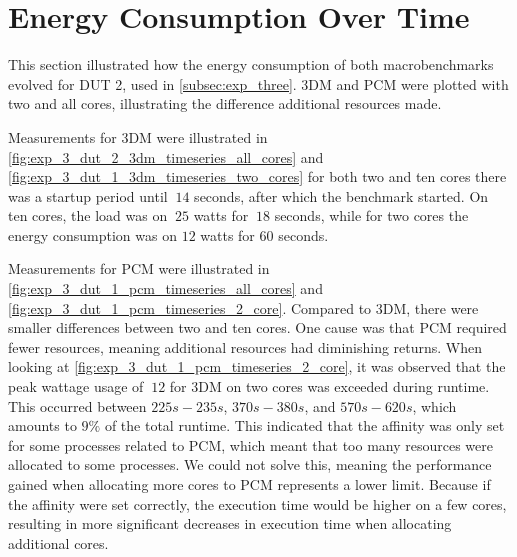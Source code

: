 \section{Energy Consumption Over Time}\label{app:timeseries}

This section illustrated how the energy consumption of both macrobenchmarks evolved for DUT 2, used in \cref{subsec:exp_three}. 3DM and PCM were plotted with two and all cores, illustrating the difference additional resources made. 

Measurements for 3DM were illustrated in \cref{fig:exp_3_dut_2_3dm_timeseries_all_cores} and \cref{fig:exp_3_dut_1_3dm_timeseries_two_cores} for both two and ten cores there was a startup period until $~14$ seconds, after which the benchmark started. On ten cores,  the load was on $~25$ watts for $~18$ seconds, while for two cores the energy consumption was on $12$ watts for $60$ seconds. 




Measurements for PCM were illustrated in \cref{fig:exp_3_dut_1_pcm_timeseries_all_cores} and \cref{fig:exp_3_dut_1_pcm_timeseries_2_core}. Compared to 3DM, there were smaller differences between two and ten cores. One cause was that PCM required fewer resources, meaning additional resources had diminishing returns. When looking at \cref{fig:exp_3_dut_1_pcm_timeseries_2_core}, it was observed that the peak wattage usage of $~12$ for 3DM on two cores was exceeded during runtime. This occurred between $225s-235s$, $370s-380s$, and $570s-620s$, which amounts to $9\%$ of the total runtime. This indicated that the affinity was only set for some processes related to PCM, which meant that too many resources were allocated to some processes. We could not solve this, meaning the performance gained when allocating more cores to PCM represents a lower limit. Because if the affinity were set correctly, the execution time would be higher on a few cores, resulting in more significant decreases in execution time when allocating additional cores.


